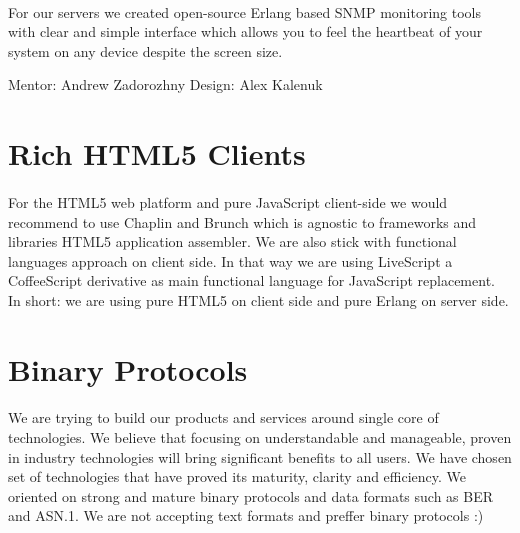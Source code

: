 \documentclass[11pt]{article}
\begin{document}
\paragraph{}
    For our servers we created open-source Erlang based SNMP monitoring tools
    with clear and simple interface which allows you to feel the heartbeat of
    your system on any device despite the screen size.


Mentor: Andrew Zadorozhny \@br Design: Alex Kalenuk


\section*{Rich HTML5 Clients}
\paragraph{}
    For the HTML5 web platform and pure JavaScript client-side we would recommend to use
    Chaplin and Brunch which is agnostic to frameworks and libraries HTML5 application assembler.
    We are also stick with functional languages approach on client side.
    In that way we are using LiveScript a CoffeeScript derivative as main functional language for JavaScript replacement.
    In short: we are using pure HTML5 on client side and pure Erlang on server side.


\section*{Binary Protocols}
\paragraph{}
    We are trying to build our products
    and services around single core of technologies. We believe that focusing on understandable
    and manageable, proven in industry technologies will bring significant benefits to all users.
    We have chosen set of technologies that have proved its maturity, clarity and efficiency.
    We oriented on strong and mature binary protocols and data formats such as BER and ASN.1.
    We are not accepting text formats and preffer binary protocols :)




\end{document}
